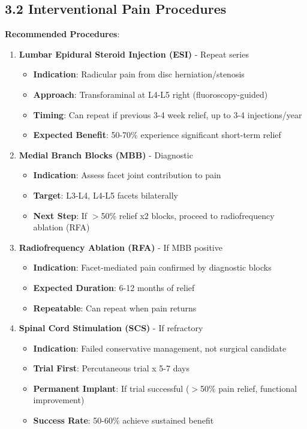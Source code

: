 \documentclass[11pt,letterpaper]{article}
\begin{document}
\subsection*{3.2 Interventional Pain Procedures}

\textbf{Recommended Procedures}:

\begin{enumerate}[leftmargin=*]
    \item \textbf{Lumbar Epidural Steroid Injection (ESI)} - Repeat series
    \begin{itemize}
        \item \textbf{Indication}: Radicular pain from disc herniation/stenosis
        \item \textbf{Approach}: Transforaminal at L4-L5 right (fluoroscopy-guided)
        \item \textbf{Timing}: Can repeat if previous 3-4 week relief, up to 3-4 injections/year
        \item \textbf{Expected Benefit}: 50-70\% experience significant short-term relief
    \end{itemize}
    
    \item \textbf{Medial Branch Blocks (MBB)} - Diagnostic
    \begin{itemize}
        \item \textbf{Indication}: Assess facet joint contribution to pain
        \item \textbf{Target}: L3-L4, L4-L5 facets bilaterally
        \item \textbf{Next Step}: If $>$50\% relief x2 blocks, proceed to radiofrequency ablation (RFA)
    \end{itemize}
    
    \item \textbf{Radiofrequency Ablation (RFA)} - If MBB positive
    \begin{itemize}
        \item \textbf{Indication}: Facet-mediated pain confirmed by diagnostic blocks
        \item \textbf{Expected Duration}: 6-12 months of relief
        \item \textbf{Repeatable}: Can repeat when pain returns
    \end{itemize}
    
    \item \textbf{Spinal Cord Stimulation (SCS)} - If refractory
    \begin{itemize}
        \item \textbf{Indication}: Failed conservative management, not surgical candidate
        \item \textbf{Trial First}: Percutaneous trial x 5-7 days
        \item \textbf{Permanent Implant}: If trial successful ($>$50\% pain relief, functional improvement)
        \item \textbf{Success Rate}: 50-60\% achieve sustained benefit
    \end{itemize}
\end{enumerate}
\end{document}
